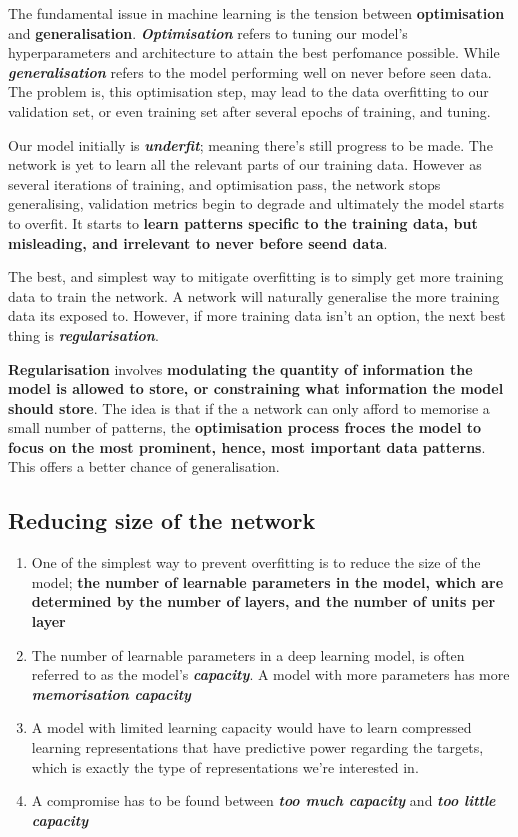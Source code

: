 \documentclass[12pt, a4paper]{article}
\begin{document}
The fundamental issue in machine learning is the tension between \textbf{optimisation} and \textbf{generalisation}.
\textbf{\textit{Optimisation} }refers to tuning our model's hyperparameters and architecture to attain the best perfomance possible.
While \textbf{\textit{generalisation}} refers to the model performing well on never before seen data.
The problem is, this optimisation step, may lead to the data overfitting to our validation set, or even training set after 
several epochs of training, and tuning.

Our model initially is \textbf{\textit{underfit}}; meaning there's still progress to be made. The network is yet to learn all the 
relevant parts of our training data. However as several iterations of training, and optimisation pass,
the network stops generalising, validation metrics begin to degrade and ultimately the model 
starts to overfit. It starts to \textbf{learn patterns specific to the training data, but misleading, and irrelevant to never before seend data}.

The best, and simplest way to mitigate overfitting is to simply get more 
training data to train the network. A network will naturally generalise the more 
training data its exposed to. However, if more training data isn't an option,
the next best thing is \textbf{\textit{regularisation}}.

\textbf{Regularisation} involves \textbf{modulating the quantity of information 
the model is allowed to store, or constraining what information the model 
should store}. The idea is that if the a network can only afford to memorise a 
small number of patterns, the \textbf{optimisation process froces the model to focus on 
the most prominent, hence, most important data patterns}. This offers a better chance 
of generalisation.

\subsection{Reducing size of the network}
\begin{enumerate}
   \item One of the simplest way to prevent overfitting is to reduce the size of the model;
   \textbf{the number of learnable parameters in the model, which are determined by the number of 
   layers, and the number of units per layer}
   \item The number of learnable parameters in a deep learning model, is often referred to 
   as the model's \textbf{\textit{capacity}}. A model with more parameters has 
   more \textbf{\textit{memorisation capacity}}
   \item A model with limited learning capacity would have to learn compressed 
   learning representations that have predictive  power regarding the targets, which is exactly the 
   type of representations we're interested in. 
   \item A compromise has to be found between \textbf{\textit{too much capacity}} and 
   \textbf{\textit{too little capacity}}
\end{enumerate}
\end{document}
